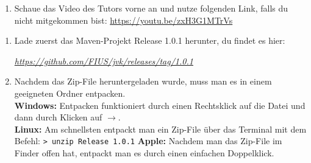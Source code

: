 

\newcommand{\jvkpackage}{Release 1.0.1}
\newcommand{\jvkpackageurl}{https://github.com/FIUS/jvk/releases/tag/1.0.1} %


\begin{Infobox}
    \begin{enumerate}[label=\arabic*.]
        \item Schaue das Video des Tutors vorne an und nutze folgenden Link, falls du nicht mitgekommen bist:
        \color{blue}\url{https://youtu.be/zxH3G1MTrVs}
    \end{enumerate}
\end{Infobox}

\begin{Infobox}
    \begin{enumerate}[label=\arabic*.]
        \item Lade zuerst das Maven-Projekt \jvkpackage { } herunter, du findet es hier:
        \begin{center}
            \color{blue}\href{\jvkpackageurl}{\textit{\jvkpackageurl}}
        \end{center}

        \item Nachdem das Zip-File heruntergeladen wurde, muss man es in einem geeigneten Ordner entpacken.\\
        \textbf{Windows:} Entpacken funktioniert durch einen Rechtsklick auf die Datei und dann durch Klicken auf $\to$.\\
        \textbf{Linux:} Am schnellsten entpackt man ein Zip-File über das Terminal mit dem Befehl:
        \newline\hspace*{\fill}\texttt{\textgreater\ unzip \jvkpackage}\hspace*{\fill}\newline
        \textbf{Apple:} Nachdem man das Zip-File im Finder offen hat, entpackt man es durch einen einfachen Doppelklick.
    \end{enumerate}
\end{Infobox}


